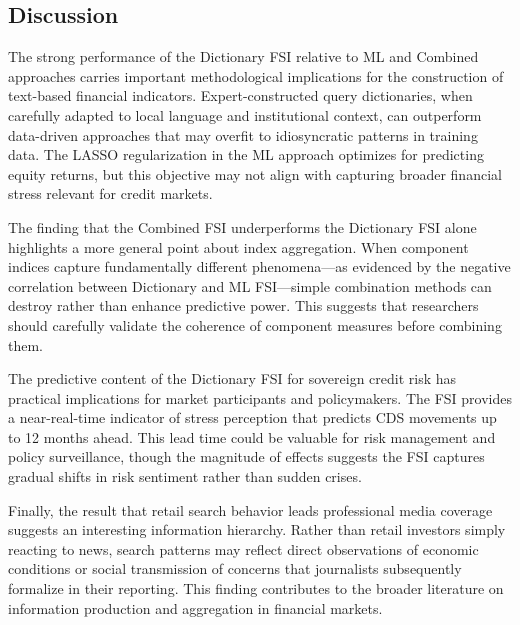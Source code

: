 \subsection{Discussion}

The strong performance of the Dictionary FSI relative to ML and Combined approaches carries important methodological implications for the construction of text-based financial indicators. Expert-constructed query dictionaries, when carefully adapted to local language and institutional context, can outperform data-driven approaches that may overfit to idiosyncratic patterns in training data. The LASSO regularization in the ML approach optimizes for predicting equity returns, but this objective may not align with capturing broader financial stress relevant for credit markets.

The finding that the Combined FSI underperforms the Dictionary FSI alone highlights a more general point about index aggregation. When component indices capture fundamentally different phenomena---as evidenced by the negative correlation between Dictionary and ML FSI---simple combination methods can destroy rather than enhance predictive power. This suggests that researchers should carefully validate the coherence of component measures before combining them.

The predictive content of the Dictionary FSI for sovereign credit risk has practical implications for market participants and policymakers. The FSI provides a near-real-time indicator of stress perception that predicts CDS movements up to 12 months ahead. This lead time could be valuable for risk management and policy surveillance, though the magnitude of effects suggests the FSI captures gradual shifts in risk sentiment rather than sudden crises.

Finally, the result that retail search behavior leads professional media coverage suggests an interesting information hierarchy. Rather than retail investors simply reacting to news, search patterns may reflect direct observations of economic conditions or social transmission of concerns that journalists subsequently formalize in their reporting. This finding contributes to the broader literature on information production and aggregation in financial markets.

